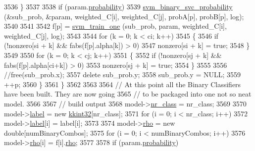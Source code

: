 \begin{DoxyCode}
{3536         \}
3537 
3538         \textcolor{keywordflow}{if}  (param.\hyperlink{struct_s_v_m289___b_f_s_1_1svm__parameter_acfe1c2e7915f38fd2c82cbf7403f6428}{probability})
3539           \hyperlink{svm289___b_f_s_8cpp_a0c841901f7446261a95fc3b3ef8621e4}{svm\_binary\_svc\_probability} (&sub\_prob, &param, weighted\_C[i], 
      weighted\_C[j], probA[p], probB[p], log);
3540 
3541 
3542         f[p] = \hyperlink{namespace_s_v_m289___b_f_s_ae92d39f186f1bce1e6cffdd3d382b948}{svm\_train\_one} (sub\_prob, param, weighted\_C[i], weighted\_C[j], log);
3543 
3544         \textcolor{keywordflow}{for}  (k = 0;  k < ci;  k++)
3545         \{
3546           \textcolor{keywordflow}{if}  (!nonzero[si + k]  &&  fabs(f[p].alpha[k]) > 0)
3547             nonzero[si + k] = \textcolor{keyword}{true};
3548         \}
3549 
3550         \textcolor{keywordflow}{for}  (k = 0;  k < cj;  k++)
3551         \{
3552           \textcolor{keywordflow}{if}  (!nonzero[sj + k]  &&  fabs(f[p].alpha[ci+k]) > 0)
3553             nonzero[sj + k] = \textcolor{keyword}{true};
3554         \}
3555 
3556         \textcolor{comment}{//free(sub\_prob.x);}
3557         \textcolor{keyword}{delete}  sub\_prob.y;  
3558         sub\_prob.y = NULL;
3559         ++p;
3560       \}
3561     \}
3562 
3563 
3564     \textcolor{comment}{// At this point all the Binary Classifiers have been built.  They are now going }
3565     \textcolor{comment}{// to be packaged into one not so neat model.}
3566 
3567     \textcolor{comment}{// build output}
3568     model->\hyperlink{struct_s_v_m289___b_f_s_1_1svm__model_af8462268ac97b24a8d96f07874522cfb}{nr\_class} = nr\_class;
3569     
3570     model->\hyperlink{struct_s_v_m289___b_f_s_1_1svm__model_a33bf273b5ce4cfff0b4d68210bfa7b2e}{label} = \textcolor{keyword}{new} \hyperlink{namespace_k_k_b_a8fa4952cc84fda1de4bec1fbdd8d5b1b}{kkint32}[nr\_class];
3571     \textcolor{keywordflow}{for}  (i = 0;  i < nr\_class;  i++)
3572       model->\hyperlink{struct_s_v_m289___b_f_s_1_1svm__model_a33bf273b5ce4cfff0b4d68210bfa7b2e}{label}[i] = label[i];
3573     
3574     model->\hyperlink{struct_s_v_m289___b_f_s_1_1svm__model_a53ee57b614f764a30ef4dc67d2a2167f}{rho} = \textcolor{keyword}{new} \textcolor{keywordtype}{double}[numBinaryCombos];
3575     for  (i = 0;  i < numBinaryCombos;  i++)
3576       model->\hyperlink{struct_s_v_m289___b_f_s_1_1svm__model_a53ee57b614f764a30ef4dc67d2a2167f}{rho}[i] = f[i].\hyperlink{struct_s_v_m289___b_f_s_1_1decision__function_a0222d06bf34cc9738dd7c66585b6f5d8}{rho};
3577 
3578     if  (param.\hyperlink{struct_s_v_m289___b_f_s_1_1svm__parameter_acfe1c2e7915f38fd2c82cbf7403f6428}{probability})
}
\end{DoxyCode}
